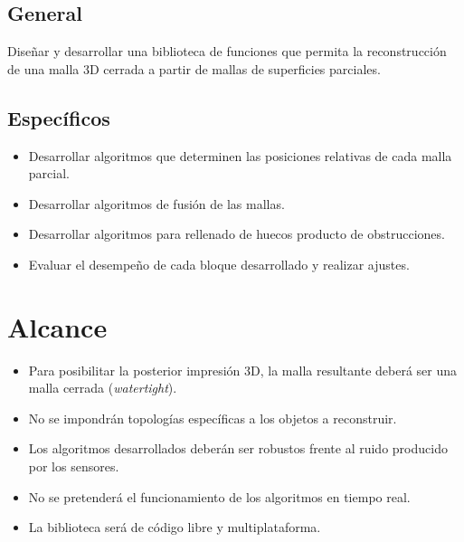 		\subsection{General}
			Diseñar y desarrollar una biblioteca de funciones que permita
			la reconstrucción de una malla 3D cerrada a partir de mallas de superficies parciales.
		\subsection{Específicos}
		\begin{itemize}
			\item Desarrollar algoritmos que determinen las posiciones relativas de cada malla parcial.
			\item Desarrollar algoritmos de fusión de las mallas.
			\item Desarrollar algoritmos para rellenado de huecos producto de obstrucciones.
			\item Evaluar el desempeño de cada bloque desarrollado y realizar ajustes.
		\end{itemize}

	\section{Alcance}
	\begin{itemize}
		\item Para posibilitar la posterior impresión 3D,
			la malla resultante deberá ser una malla cerrada (\emph{watertight}).
		\item No se impondrán topologías específicas a los objetos a reconstruir.
		\item Los algoritmos desarrollados deberán ser robustos frente al ruido producido por los sensores.
		\item No se pretenderá el funcionamiento de los algoritmos en tiempo real.
		\item La biblioteca será de código libre y multiplataforma.
	\end{itemize}
